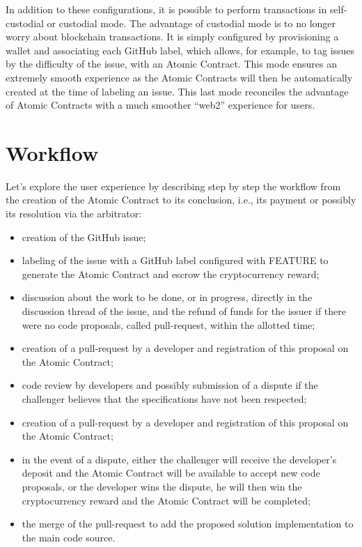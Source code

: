 \documentclass[
	a4paper, %
	10pt, %
	unnumberedsections, %
	twoside, %
]{LTJournalArticle}
\begin{document}
In addition to these configurations, it is possible to perform transactions in self-custodial or custodial mode. The advantage of custodial mode is to no longer worry about blockchain transactions. It is simply configured by provisioning a wallet and associating each GitHub label, which allows, for example, to tag issues by the difficulty of the issue, with an Atomic Contract. This mode ensures an extremely smooth experience as the Atomic Contracts will then be automatically created at the time of labeling an issue. This last mode reconciles the advantage of Atomic Contracts with a much smoother ``web2'' experience for users.



\section{Workflow}

Let's explore the user experience by describing step by step the workflow from the creation of the Atomic Contract to its conclusion, i.e., its payment or possibly its resolution via the arbitrator:

\begin{itemize}
\item
  creation of the GitHub issue;
\item
  labeling of the issue with a GitHub label configured with FEATURE to generate the Atomic Contract and escrow the cryptocurrency reward;
\item
  discussion about the work to be done, or in progress, directly in the discussion thread of the issue, and the refund of funds for the issuer if there were no code proposals, called pull-request, within the allotted time;
\item
  creation of a pull-request by a developer and registration of this proposal on the Atomic Contract;
\item
  code review by developers and possibly submission of a dispute if the challenger believes that the specifications have not been respected;
\item
  creation of a pull-request by a developer and registration of this proposal on the Atomic Contract;
\item
  in the event of a dispute, either the challenger will receive the developer's deposit and the Atomic Contract will be available to accept new code proposals, or the developer wins the dispute, he will then win the cryptocurrency reward and the Atomic Contract will be completed;
\item
  the merge of the pull-request to add the proposed solution implementation to the main code source.
\end{itemize}
\end{document}

